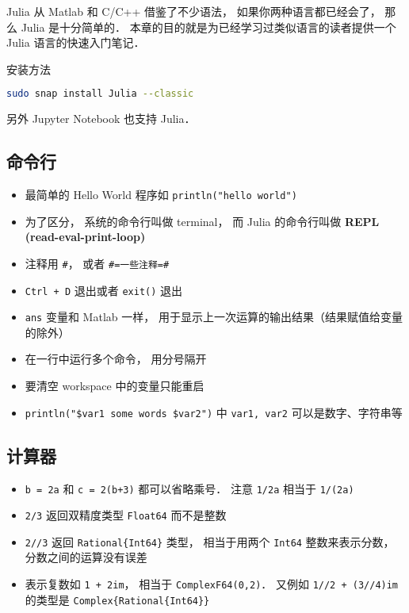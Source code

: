 
\begin{issues}
\issueDraft
\end{issues}

Julia 从 Matlab 和 C/C++ 借鉴了不少语法， 如果你两种语言都已经会了， 那么 Julia 是十分简单的． 本章的目的就是为已经学习过类似语言的读者提供一个 Julia 语言的快速入门笔记．

安装方法
\begin{lstlisting}[language=bash]
sudo snap install Julia --classic
\end{lstlisting}

另外 Jupyter Notebook 也支持 Julia．

\subsection{命令行}
\begin{itemize}
\item 最简单的 Hello World 程序如 \verb|println("hello world")|

\item 为了区分， 系统的命令行叫做 terminal， 而 Julia 的命令行叫做 \textbf{REPL (read-eval-print-loop)}
\item 注释用 \verb|#|， 或者 \verb|#=一些注释=#|
\item \verb|Ctrl + D| 退出或者 \verb|exit()| 退出
\item \verb|ans| 变量和 Matlab 一样， 用于显示上一次运算的输出结果（结果赋值给变量的除外）
\item 在一行中运行多个命令， 用分号隔开
\item 要清空 workspace 中的变量只能重启
\item \verb|println("$var1 some words $var2")| 中 \verb|var1, var2| 可以是数字、字符串等
\end{itemize}

\subsection{计算器}
\begin{itemize}
\item \verb|b = 2a| 和 \verb|c = 2(b+3)| 都可以省略乘号． 注意 \verb|1/2a| 相当于 \verb|1/(2a)|
\item \verb|2/3| 返回双精度类型 \verb|Float64| 而不是整数
\item \verb|2//3| 返回 \verb|Rational{Int64}| 类型， 相当于用两个 \verb|Int64| 整数来表示分数， 分数之间的运算没有误差
\item 表示复数如 \verb|1 + 2im|， 相当于 \verb|ComplexF64(0,2)|． 又例如 \verb|1//2 + (3//4)im| 的类型是 \verb|Complex{Rational{Int64}}|
\end{itemize}

